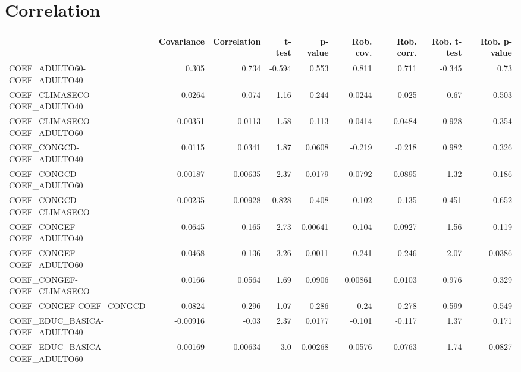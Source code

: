 \section{Correlation}
\begin{tabular}{lrrrrrrrr}
\toprule
{} &  Covariance &  Correlation &   t-test &  p-value &  Rob. cov. &  Rob. corr. &  Rob. t-test &  Rob. p-value \\
\midrule
COEF\_ADULTO60-COEF\_ADULTO40            &       0.305 &        0.734 &   -0.594 &    0.553 &      0.811 &       0.711 &       -0.345 &          0.73 \\
COEF\_CLIMASECO-COEF\_ADULTO40           &      0.0264 &        0.074 &     1.16 &    0.244 &    -0.0244 &      -0.025 &         0.67 &         0.503 \\
COEF\_CLIMASECO-COEF\_ADULTO60           &     0.00351 &       0.0113 &     1.58 &    0.113 &    -0.0414 &     -0.0484 &        0.928 &         0.354 \\
COEF\_CONGCD-COEF\_ADULTO40              &      0.0115 &       0.0341 &     1.87 &   0.0608 &     -0.219 &      -0.218 &        0.982 &         0.326 \\
COEF\_CONGCD-COEF\_ADULTO60              &    -0.00187 &     -0.00635 &     2.37 &   0.0179 &    -0.0792 &     -0.0895 &         1.32 &         0.186 \\
COEF\_CONGCD-COEF\_CLIMASECO             &    -0.00235 &     -0.00928 &    0.828 &    0.408 &     -0.102 &      -0.135 &        0.451 &         0.652 \\
COEF\_CONGEF-COEF\_ADULTO40              &      0.0645 &        0.165 &     2.73 &  0.00641 &      0.104 &      0.0927 &         1.56 &         0.119 \\
COEF\_CONGEF-COEF\_ADULTO60              &      0.0468 &        0.136 &     3.26 &   0.0011 &      0.241 &       0.246 &         2.07 &        0.0386 \\
COEF\_CONGEF-COEF\_CLIMASECO             &      0.0166 &       0.0564 &     1.69 &   0.0906 &    0.00861 &      0.0103 &        0.976 &         0.329 \\
COEF\_CONGEF-COEF\_CONGCD                &      0.0824 &        0.296 &     1.07 &    0.286 &       0.24 &       0.278 &        0.599 &         0.549 \\
COEF\_EDUC\_BASICA-COEF\_ADULTO40         &    -0.00916 &        -0.03 &     2.37 &   0.0177 &     -0.101 &      -0.117 &         1.37 &         0.171 \\
COEF\_EDUC\_BASICA-COEF\_ADULTO60         &    -0.00169 &     -0.00634 &      3.0 &  0.00268 &    -0.0576 &     -0.0763 &         1.74 &        0.0827 \\

\end{tabular}
